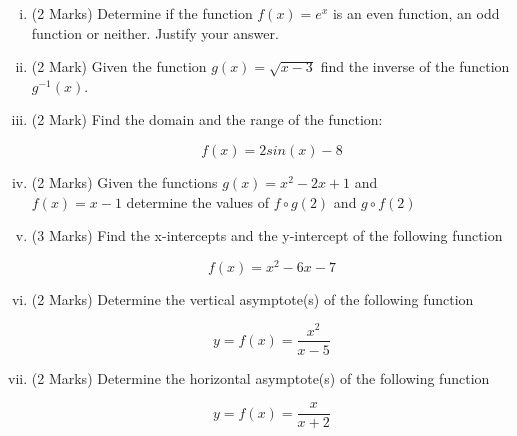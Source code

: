 \documentclass[11pt]{article} %
\begin{document}
\begin{enumerate}[(i)]
	\item (2 Marks) Determine if the function $f(x) = e^x$ is an even function, an odd function or neither. Justify your answer.
\vspace{8.8cm}

	\item (2 Mark) Given the function $g(x) = \sqrt{x-3}$ find the inverse of the function $g^{-1}(x)$.

\newpage

	\item (2 Mark) Find the domain and the range of the function:
	
	\[ f(x) = 2 sin(x)  - 8 \]
	
	\newpage
		
	\item (2 Marks) Given the functions $g(x) = x^2 - 2x  +1$ and \\ $f(x) = x-1$ determine the values of $f \circ g(2)$ and $g \circ f(2)$
	
	\vspace{8.8cm}
	
	

	\item (3 Marks) Find the x-intercepts and the y-intercept of the following function

\[ f(x) = x^2 - 6x - 7  \]

	\newpage
	
	\item (2 Marks) Determine the vertical asymptote(s) of the following function


\[ y = f(x) = \frac{x^2}{x-5} \]	

\vspace{5.8cm}
	
	\item (2 Marks) Determine the horizontal asymptote(s) of the following function
	
	\[ y = f(x) = \frac{x}{x+2} \]
	
\end{enumerate}
\end{document}
